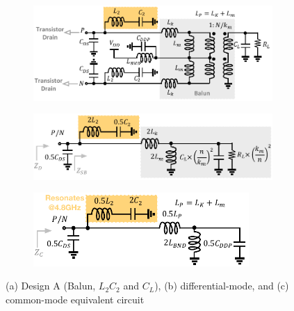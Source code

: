 \documentclass[conference]{IEEEtran}
\begin{document}
\begin{figure}[!t]
\captionsetup{font=footnotesize}
\centering
\begin{subfigure}{0.5\textwidth}
\centering
\includegraphics[width=1\textwidth]{Images/Design/Design_A_FC.pdf}
\caption{}
\label{fig:Design_A_FC}
\end{subfigure}
\begin{subfigure}[b]{0.24\textwidth}
\includegraphics[width=1\textwidth]{Images/Design/Design_A_Diff.pdf}
\caption{}
\label{fig:Design_A_Diff}
\end{subfigure}
\begin{subfigure}[b]{0.24\textwidth}
\includegraphics[width=0.9\textwidth]{Images/Design/Design_A_Com.pdf}
\caption{}
\label{fig:Design_A_Com}
\end{subfigure}
\caption{(a) Design A (Balun, $L_2C_2$ and $C_L$), (b) differential-mode, and (c) common-mode equivalent circuit }
\label{fig:Design_A}
\vspace{-0.2in}
\end{figure}
\end{document}
